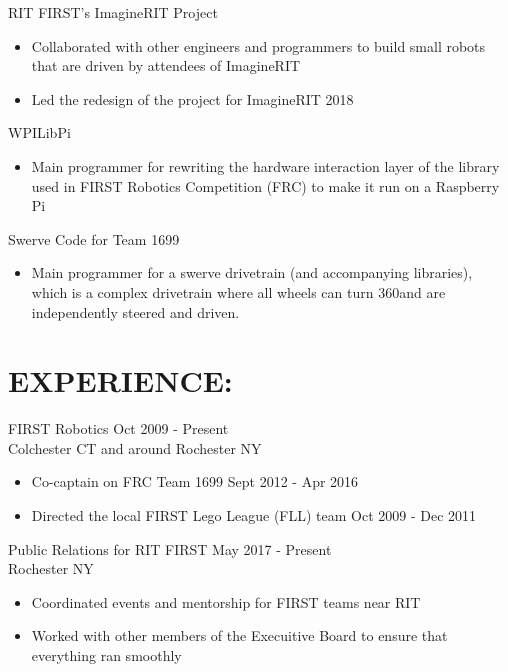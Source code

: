 \documentclass[line,margin]{res}
\begin{document}
\begin{resume}
	RIT FIRST's ImagineRIT Project
		\begin{itemize}
			\item Collaborated with other engineers and programmers to build small robots that are driven by attendees of ImagineRIT 
			\item Led the redesign of the project for ImagineRIT 2018
		\end{itemize}

	WPILibPi
		\begin{itemize}
			\item Main programmer for rewriting the hardware interaction layer of the library used in FIRST Robotics Competition (FRC) to make it run on a Raspberry Pi 
		\end{itemize}

	Swerve Code for Team 1699
		\begin{itemize} 
			\item Main programmer for a swerve drivetrain (and accompanying libraries), which is a complex drivetrain where all wheels can turn 360\textdegree and are independently steered and driven.
		\end{itemize}

\section{EXPERIENCE:}

	FIRST Robotics \hfill Oct 2009 - Present\\
	Colchester CT and around Rochester NY
	\begin{itemize}
		\item Co-captain on FRC Team 1699 \hfill Sept 2012 - Apr 2016
		\item Directed the local FIRST Lego League (FLL) team \hfill Oct 2009 - Dec 2011
	\end{itemize}

	Public Relations for RIT FIRST \hfill May 2017 - Present\\
	Rochester NY
	\begin{itemize}
		\item Coordinated events and mentorship for FIRST teams near RIT
		\item Worked with other members of the Execuitive Board to ensure that everything ran smoothly
	\end{itemize}


\end{resume}
\end{document}
